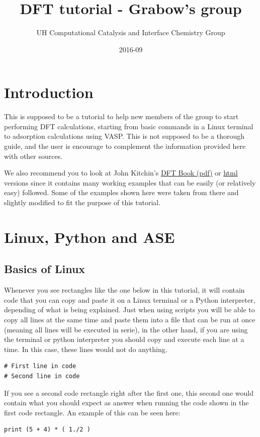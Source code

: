 \documentclass[11pt]{article}
\author{UH Computational Catalysis and Interface Chemistry Group}
\date{2016-09}
\title{DFT tutorial - Grabow's group}
\begin{document}
\tableofcontents


\section{Introduction}
\label{sec-1}
This is supposed to be a tutorial to help new members of the group to start performing DFT calculations, starting from basic commands in a Linux terminal to adsorption calculations using VASP. This is not supposed to be a thorough guide, and the user is encourage to complement the information provided here with other sources.

We also recommend you to look at John Kitchin's \href{http://kitchingroup.cheme.cmu.edu/dft-book/dft.pdf}{DFT Book (pdf)} or \href{http://kitchingroup.cheme.cmu.edu/dft-book/dft.html}{html} versions since it contains many working examples that can be easily (or relatively easy) followed. Some of the examples shown here were taken from there and slightly modified to fit the purpose of this tutorial.  
\section{Linux, Python and ASE}
\label{sec-2}
\subsection{Basics of Linux}
\label{sec-2-1}
Whenever you see rectangles like the one below in this tutorial, it will contain code that you can copy and paste it on a Linux terminal or a Python interpreter, depending of what is being explained. Just when using scripts you will be able to copy all lines at the same time and paste them into a file that can be run at once (meaning all lines will be executed in serie), in the other hand, if you are using the terminal or python interpreter you should copy and execute each line at a time. In this case, these lines would not do anything.
\begin{verbatim}
# First line in code 
# Second line in code
\end{verbatim}

If you see a second code rectangle right after the first one, this second one would contain what you should expect as answer when running the code shown in the first code rectangle. An example of this can be seen here:
\begin{verbatim}
print (5 + 4) * ( 1./2 )
\end{verbatim}
\end{document}
